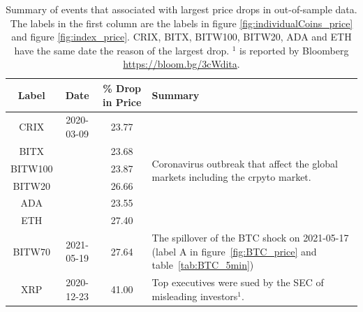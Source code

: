 \begin{table}[!]
    \centering
      \begin{tabularx}{.8\textwidth}{cccX}
        \toprule
        Label &  Date & \% Drop in Price &  Summary\\
        \midrule
        CRIX    &2020-03-09 & 23.77 & \multirow[t]{6}{\hsize}{Coronavirus outbreak that affect the global markets including the crpyto market.}\\
        BITX    & & 23.68 &  \\
        BITW100 & & 23.87 &  \\
        BITW20  & & 26.66 &  \\
        ADA     & &23.55 &  \\
        ETH     & &27.40 &  \\
        BITW70  & 2021-05-19& 27.64 & The spillover of the BTC shock on 2021-05-17 (label A in figure~\ref{fig:BTC_price} and table~\ref{tab:BTC_5min})\\
        XRP     & 2020-12-23 & 41.00 & Top executives were sued by the SEC of misleading investors$^1$. \\
        \bottomrule
      \end{tabularx}
        \caption{Summary of events that associated with largest price drops in out-of-sample data.
        The labels in the first column are the labels in figure \ref{fig:individualCoins_price} and figure \ref{fig:index_price}.
        CRIX, BITX, BITW100, BITW20, ADA and ETH have the same date the reason of the largest drop. $^1$ is reported by Bloomberg \url{https://bloom.bg/3cWdita}.}
        \label{tab:All_min}
  \end{table}


